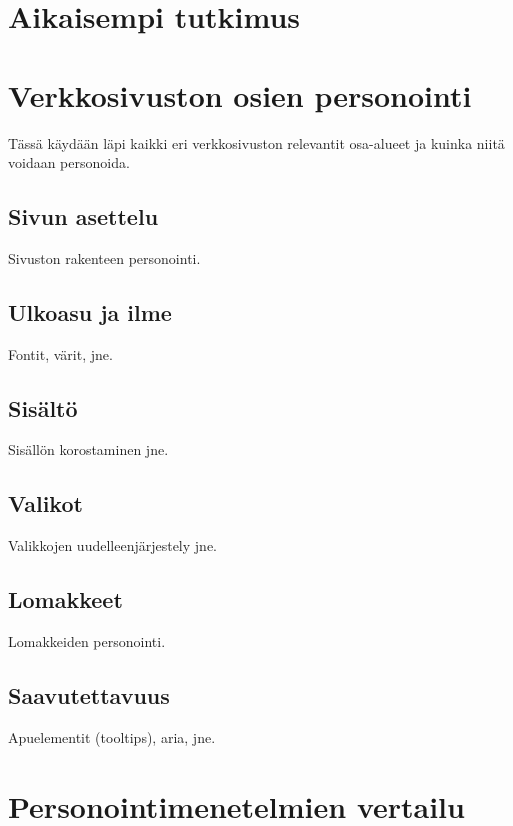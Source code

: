 \documentclass[finnish, 12pt, a4paper, elec, utf8, a-1b, online]{aaltothesis}
\begin{document}
\clearpage

\section{Aikaisempi tutkimus}

\clearpage

\section{Verkkosivuston osien personointi}

Tässä käydään läpi kaikki eri verkkosivuston relevantit osa-alueet ja kuinka
niitä voidaan personoida.

\subsection{Sivun asettelu}

Sivuston rakenteen personointi.

\subsection{Ulkoasu ja ilme}

Fontit, värit, jne.

\subsection{Sisältö}

Sisällön korostaminen jne.

\subsection{Valikot}

Valikkojen uudelleenjärjestely jne.

\subsection{Lomakkeet}

Lomakkeiden personointi.

\subsection{Saavutettavuus}

Apuelementit (tooltips), aria, jne.

\clearpage

\section{Personointimenetelmien vertailu}
\end{document}
